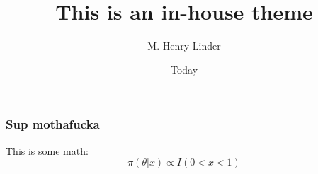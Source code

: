 \documentclass{beamer}
\title{This is an in-house theme}
\date{Today}
\author{M. Henry Linder}
\begin{document}
\begin{frame}
\titlepage
\end{frame}

\begin{frame}
  \frametitle{Sup mothafucka}

  This is some math:
  \[ \pi(\theta|x) \propto I(0<x<1) \]
\end{frame}
\end{document}
